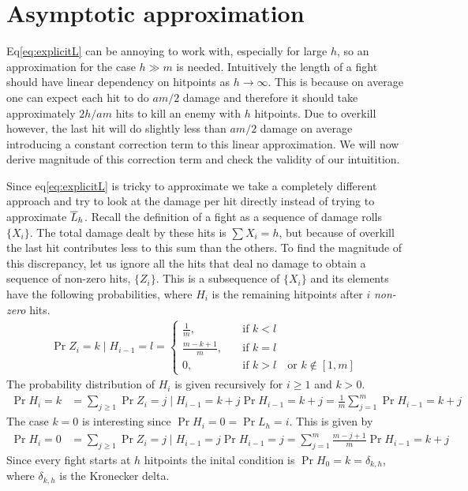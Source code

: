 \section{Asymptotic approximation}
Eq\ref{eq:explicitL} can be annoying to work with, especially for large $h$, so an approximation for the case $h \gg m$ is needed. Intuitively the length of a fight should have linear dependency on hitpoints as $h \rightarrow \infty$. This is because on average one can expect each hit to do $am/2$ damage and therefore it should take approximately $2h/am$ hits to kill an enemy with $h$ hitpoints. Due to overkill however, the last hit will do slightly less than $am/2$ damage on average introducing a constant correction term to this linear approximation. We will now derive magnitude of this correction term and check the validity of our intuitition.

Since eq\ref{eq:explicitL} is tricky to approximate we take a completely different approach and try to look at the damage per hit directly instead of trying to approximate $\overline{L}_h$. Recall the definition of a fight as a sequence of damage rolls $\{X_i\}$. The total damage dealt by these hits is $\sum X_i = h$, but because of overkill the last hit contributes less to this sum than the others. To find the magnitude of this discrepancy, let us ignore all the hits that deal no damage to obtain a sequence of non-zero hits, $\{Z_i\}$. This is a subsequence of $\{X_i\}$ and its elements have the following probabilities, where $H_i$ is the remaining hitpoints after $i$ \textit{non-zero} hits.
\begin{align}
    \Pr{Z_i = k \mid H_{i-1} = l} = \begin{cases}
        \frac{1}{m}, &\quad\mbox{if } k < l\\
        \frac{m-k+1}{m}, &\quad\mbox{if } k = l\\
        0, &\quad\mbox{if } k > l \quad \mbox{or } k \notin [1,m]
    \end{cases}
\end{align}
The probability distribution of $H_i$ is given recursively for $i \geq 1$ and $k > 0$.
\begin{align}
    \Pr{H_i = k} &= \sum_{j\geq 1} \Pr{Z_i = j \mid H_{i-1} = k+j}\Pr{H_{i-1} = k+j} = \frac{1}{m}\sum_{j=1}^m \Pr{H_{i-1} = k+j}
\end{align}
The case $k=0$ is interesting since $\Pr{H_i = 0} = \Pr{L_h = i}$. This is given by
\begin{align}
    \Pr{H_i = 0} &= \sum_{j\geq 1} \Pr{Z_i = j \mid H_{i-1} = j}\Pr{H_{i-1} = j} = \sum_{j=1}^m \frac{m-j+1}{m}\Pr{H_{i-1} = k+j}
\end{align}
Since every fight starts at $h$ hitpoints the inital condition is $\Pr{H_0=k} = \delta_{k,h}$, where $\delta_{k,h}$ is the Kronecker delta.

